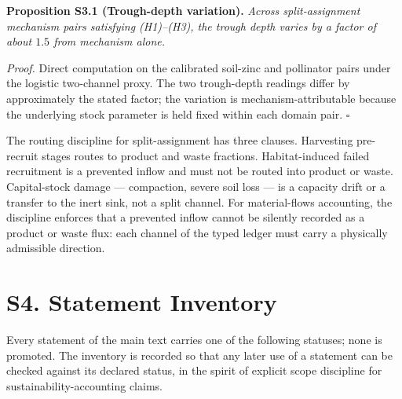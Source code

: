 \documentclass[11pt]{article}
\begin{document}
\textbf{Proposition S3.1 (Trough-depth variation).} \emph{Across split-assignment mechanism pairs satisfying (H1)--(H3), the trough depth varies by a factor of about \(1.5\) from mechanism alone.}

\emph{Proof.} Direct computation on the calibrated soil-zinc and pollinator pairs under the logistic two-channel proxy. The two trough-depth readings differ by approximately the stated factor; the variation is mechanism-attributable because the underlying stock parameter is held fixed within each domain pair. \(\square\)

The routing discipline for split-assignment has three clauses. Harvesting pre-recruit stages routes to product and waste fractions. Habitat-induced failed recruitment is a prevented inflow and must not be routed into product or waste. Capital-stock damage --- compaction, severe soil loss --- is a capacity drift or a transfer to the inert sink, not a split channel. For material-flows accounting, the discipline enforces that a prevented inflow cannot be silently recorded as a product or waste flux: each channel of the typed ledger must carry a physically admissible direction.

\vspace{0.8em}

\section*{S4. Statement Inventory}\label{s4-statement-inventory}

Every statement of the main text carries one of the following statuses; none is promoted. The inventory is recorded so that any later use of a statement can be checked against its declared status, in the spirit of explicit scope discipline for sustainability-accounting claims.
\end{document}
